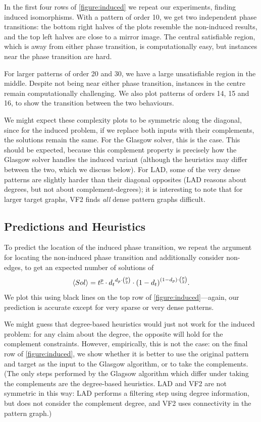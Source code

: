 \documentclass[twoside,11pt]{article}
\begin{document}
In the first four rows of \cref{figure:induced} we repeat our experiments, finding induced
isomorphisms. With a pattern of order 10, we get two independent phase transitions: the bottom right
halves of the plots resemble the non-induced results, and the top left halves are close to a mirror
image. The central satisfiable region, which is away from either phase transition, is
computationally easy, but instances near the phase transition are hard.

For larger patterns of order 20 and 30, we have a large unsatisfiable region in the middle. Despite
not being near either phase transition, instances in the centre remain computationally challenging.
We also plot patterns of orders 14, 15 and 16, to show the transition between the two behaviours.

We might expect these complexity plots to be symmetric along the diagonal, since for the induced
problem, if we replace both inputs with their complements, the solutions remain the same.  For the
Glasgow solver, this is the case. This should be expected, because this complement property is
precisely how the Glasgow solver handles the induced variant (although the heuristics may differ
between the two, which we discuss below). For LAD, some of the very dense patterns are slightly
harder than their diagonal opposites (LAD reasons about degrees, but not about complement-degrees);
it is interesting to note that for larger target graphs, VF2 finds \emph{all} dense pattern graphs
difficult.

\subsection{Predictions and Heuristics}

To predict the location of the induced phase transition, we repeat the argument for locating the
non-induced phase transition and additionally consider non-edges, to get an expected number of
solutions of \begin{equation}\label{equation:induced-prediction} \langle Sol \rangle = t^{\underline{p}} \cdot {d_t}^{d_p \cdot \binom{p}{2}} \cdot
{(1 - d_{t})}^{(1 - d_{p}) \cdot \binom{p}{2}} \textnormal{.} \end{equation} We plot this using black lines on
the top row of \cref{figure:induced}---again, our prediction is accurate except for very sparse or
very dense patterns.

We might guess that degree-based heuristics would just not work for the induced problem: for any
claim about the degree, the opposite will hold for the complement constraints. However, empirically,
this is not the case: on the final row of \cref{figure:induced}, we show whether it is better to use
the original pattern and target as the input to the Glasgow algorithm, or to take the complements.
(The only steps performed by the Glagsow algorithm which differ under taking the complements are
the degree-based heuristics.  LAD and VF2 are not symmetric in this way: LAD performs a filtering
step using degree information, but does not consider the complement degree, and VF2 uses
connectivity in the pattern graph.)
\end{document}
